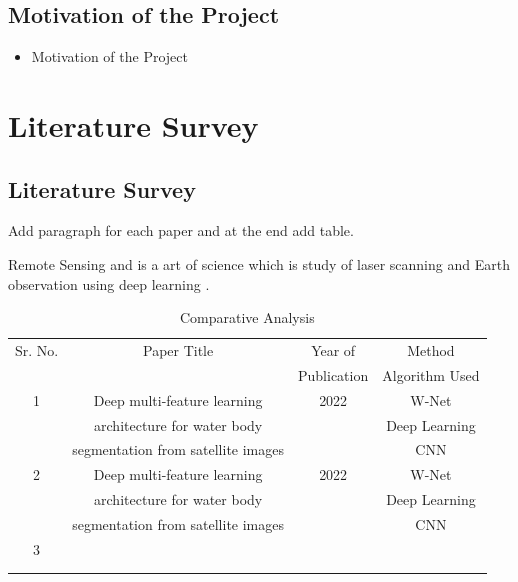 \documentclass[oneside,a4paper,12pt]{report}
\begin{document}
\section{Motivation of the Project}  
\begin{itemize}
\item Motivation of the Project
\end{itemize}


\chapter{Literature Survey}
\section{Literature Survey}
Add paragraph for each paper and at the end add table. 

Remote Sensing \cite{r1} and \cite{r2} is a art of science which is study \cite{r3} of laser scanning and Earth observation using deep learning \cite{r4}.  

\begin{table}[!htbp]
\begin{center}
\def\arraystretch{1.5}
  \begin{tabular}{| c | c | c | c |}
\hline
Sr. No. &	Paper Title &	Year of & Method \\
&	 &	Publication & Algorithm Used \\

\hline
1 &	Deep multi-feature learning  &	 2022  & W-Net\\
 &	architecture for water body  &	 &Deep Learning \\
 &	 segmentation from satellite images  & 	 & CNN\\

 \hline
2 &	Deep multi-feature learning  &	 2022  & W-Net\\
 &	architecture for water body  &	 &Deep Learning \\
 &	 segmentation from satellite images  & 	 & CNN\\
\hline
3 &	  &	   & \\
 &	  &	 & \\
 &	   & 	 & \\
\hline

\end{tabular}
 \caption { Comparative Analysis }
 \label{tab:CompAna}
\end{center}

\end{table}
\end{document}
